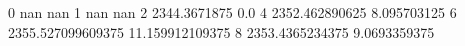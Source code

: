 0 nan nan
1 nan nan
2 2344.3671875 0.0
4 2352.462890625 8.095703125
6 2355.527099609375 11.159912109375
8 2353.4365234375 9.0693359375
